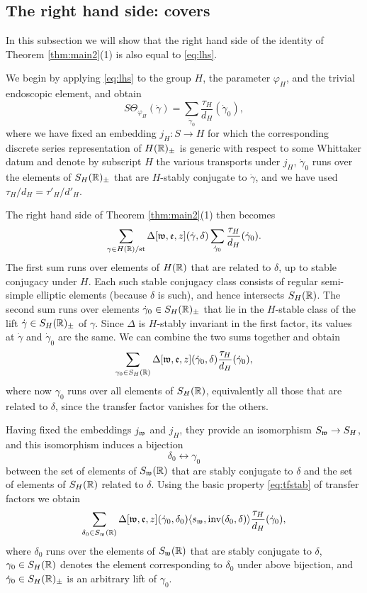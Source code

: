 \documentclass{article}
\theoremstyle{definition}
\numberwithin{equation}{section}
\renewcommand{\-}{\hyp{}}
\begin{document}
\subsection{The right hand side: covers} \label{sub:rhs_cover}

In this subsection we will show that the right hand side of the identity of Theorem \ref{thm:main2}(1) is also equal to \eqref{eq:lhs}.

We begin by applying \eqref{eq:lhs} to the group $H$, the parameter $\varphi_H$, and the trivial endoscopic element, and obtain
\[ S\Theta_{\varphi_H}(\dot\gamma) = \sum_{\dot\gamma_0} \frac{\tau_H}{d_{H}}(\dot\gamma_0), \]
where we have fixed an embedding $j_H : S \to H$ for which the corresponding discrete series representation of $H(\mathbb{R})_\pm$ is generic with respect to some Whittaker datum and denote by subscript $H$ the various transports under $j_H$, $\dot\gamma_0$ runs over the elements of $S_H(\mathbb{R})_\pm$ that are $H$-stably conjugate to $\dot\gamma$, and we have used $\tau_H/d_H=\tau'_H/d'_H$.

The right hand side of Theorem \ref{thm:main2}(1) then becomes
\[ \sum_{\gamma \in H(\mathbb{R})/\textrm{st}} \Delta[\mathfrak{w},\mathfrak{e},z](\dot\gamma,\delta)\sum_{\dot\gamma_0} \frac{\tau_H}{d_{H}}(\dot\gamma_0). \]
The first sum runs over elements of $H(\mathbb{R})$ that are related to $\delta$, up to stable conjugacy under $H$. Each such stable conjugacy class consists of regular semi-simple elliptic elements (because $\delta$ is such), and hence intersects $S_H(\mathbb{R})$. The second sum runs over elements $\dot\gamma_0 \in S_H(\mathbb{R})_\pm$ that lie in the $H$-stable class of the lift $\dot\gamma \in S_H(\mathbb{R})_\pm$ of $\gamma$. Since $\Delta$ is $H$-stably invariant in the first factor, its values at $\dot\gamma$ and $\dot\gamma_0$ are the same. We can combine the two sums together and obtain
\[ \sum_{\gamma_0 \in S_H(\mathbb{R})} \Delta[\mathfrak{w},\mathfrak{e},z](\dot\gamma_0,\delta) \frac{\tau_H}{d_{H}}(\dot\gamma_0), \]
where now $\gamma_0$ runs over all elements of $S_H(\mathbb{R})$, equivalently all those that are related to $\delta$, since the transfer factor vanishes for the others.


Having fixed the embeddings $j_{\mathfrak{w}}$ and $j_H$, they provide an isomorphism $S_{\mathfrak{w}} \to S_H$, and this isomorphism induces a bijection
\[ \delta_0 \leftrightarrow \gamma_0 \]
between the set of elements of $S_{\mathfrak{w}}(\mathbb{R})$ that are stably conjugate to $\delta$ and the set of elements of $S_H(\mathbb{R})$ related to $\delta$. Using the basic property \eqref{eq:tfstab} of transfer factors we obtain
\begin{equation} \label{eq:rhs1}
\sum_{\delta_0 \in S_{\mathfrak{w}}(\mathbb{R})} \Delta[\mathfrak{w},\mathfrak{e},z](\dot\gamma_0,\delta_0)\langle s_{\mathfrak{w}},\textrm{inv}(\delta_0,\delta)\rangle \frac{\tau_H}{d_{H}}(\dot\gamma_0),
\end{equation}
where $\delta_0$ runs over the elements of $S_{\mathfrak{w}}(\mathbb{R})$ that are stably conjugate to $\delta$, $\gamma_0 \in S_H(\mathbb{R})$ denotes the element corresponding to $\delta_0$ under above bijection, and $\dot\gamma_0 \in S_H(\mathbb{R})_\pm$ is an arbitrary lift of $\gamma_0$.
\end{document}
